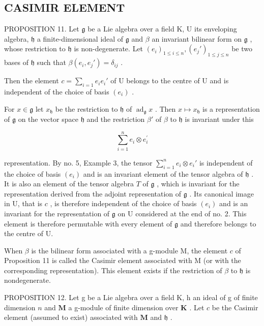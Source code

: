 \subsection{CASIMIR ELEMENT}

PROPOSITION 11. Let \(\mathfrak{g}\) be a Lie algebra over a field K, U its enveloping algebra, \(\mathfrak{h}\) a finite-dimensional ideal of \(\mathfrak{g}\) and \(\beta\) an invariant bilinear form on \(\mathfrak{g}\) , whose restriction to \(\mathfrak{h}\) is non-degenerate. Let \((e_i)_{1\leqslant i\leqslant n}, (e_j')_{1\leqslant j\leqslant n}\) be two bases of \(\mathfrak{h}\) such that \(\beta(e_i,e_j') = \delta_{ij}\) .

Then the element \(c = \sum_{i=1} e_i e_i'\) of U belongs to the centre of U and is independent of the choice of basis \((e_i)\) .

For \(x \in \mathfrak{g}\) let \(x_{\mathfrak{h}}\) be the restriction to \(\mathfrak{h}\) of \(\operatorname{ad}_{\mathfrak{g}} x\) . Then \(x \mapsto x_{\mathfrak{h}}\) is a representation of \(\mathfrak{g}\) on the vector space \(\mathfrak{h}\) and the restriction \(\beta'\) of \(\beta\) to \(\mathfrak{h}\) is invariant under this

\[
\sum_ {i = 1} ^ {n} e _ {i} \otimes e _ {i} ^ {\prime}
\]

representation. By no. 5, Example 3, the tensor \(\sum_{i=1}^{n} e_i \otimes e_i'\) is independent of the choice of basis \((e_i)\) and is an invariant element of the tensor algebra of \(\mathfrak{h}\) . It is also an element of the tensor algebra \(T\) of \(\mathfrak{g}\) , which is invariant for the representation derived from the adjoint representation of \(\mathfrak{g}\) . Its canonical image in U, that is \(c\) , is therefore independent of the choice of basis \((e_i)\) and is an invariant for the representation of \(\mathfrak{g}\) on U considered at the end of no. 2. This element is therefore permutable with every element of \(\mathfrak{g}\) and therefore belongs to the centre of U.

When \(\beta\) is the bilinear form associated with a g-module M, the element \(c\) of Proposition 11 is called the Casimir element associated with M (or with the corresponding representation). This element exists if the restriction of \(\beta\) to \(\mathfrak{h}\) is nondegenerate.

PROPOSITION 12. Let g be a Lie algebra over a field K, h an ideal of g of finite dimension \(n\) and \(\mathbf{M}\) a g-module of finite dimension over \(\mathbf{K}\) . Let \(c\) be the Casimir element (assumed to exist) associated with \(\mathbf{M}\) and \(\mathfrak{h}\) .

